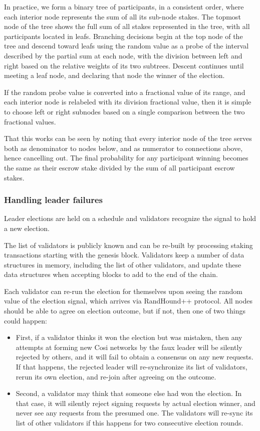 \documentclass[a4paper, 10pt, conference]{ieeeconf}
\begin{document}
In practice, we form a binary tree of participants, in a consistent order, where each interior node represents the sum of all its sub-node stakes. The topmost node of the tree shows the full sum of all stakes represented in the tree, with all participants located in leafs. Branching decisions begin at the top node of the tree and descend toward leafs using the random value as a probe of the interval described by the partial sum at each node, with the division between left and right based on the relative weights of its two subtrees. Descent continues until meeting a leaf node, and declaring that node the winner of the election. 

If the random probe value is converted into a fractional value of its range, and each interior node is relabeled with its division fractional value, then it is simple to choose left or right subnodes based on a single comparison between the two fractional values.

That this works can be seen by noting that every interior node of the tree serves both as denominator to nodes below, and as numerator to connections above, hence cancelling out. The final probability for any participant winning becomes the same as their escrow stake divided by the sum of all participant escrow stakes.

\subsubsection{Handling leader failures} Leader elections are held on a schedule and validators recognize the signal to hold a new election. 

The list of validators is publicly known and can be re-built by processing staking transactions starting with the genesis block. Validators keep a number of data structures in memory, including the list of other validators, and update these data structures when accepting blocks to add to the end of the chain.

Each validator can re-run the election for themselves upon seeing the random value of the election signal, which arrives via RandHound++ protocol. All nodes should be able to agree on election outcome, but if not, then one of two things could happen: 

\begin{itemize}
	\item{First, if a validator thinks it won the election but was mistaken, then any attempts at forming new Cosi networks by the faux leader will be silently rejected by others, and it will fail to obtain a consensus on any new requests. If that happens, the rejected leader will re-synchronize its list of validators, rerun its own election, and re-join after agreeing on the outcome.} 
	\item{Second, a validator may think that someone else had won the election. In that case, it will silently reject signing requests by actual election winner, and never see any requests from the presumed one. The validators will re-sync its list of other validators if this happens for two consecutive election rounds.}
\end{itemize}
\end{document}
